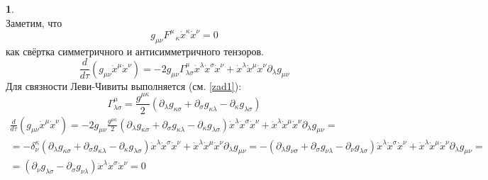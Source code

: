 \documentclass[12pt]{article}
\theoremstyle{definition}
\newtheorem{zad}{}[section]
\begin{document}
\begin{zad}
\begin{equation}
\end{equation}
Заметим, что
\begin{equation}
    g_{\mu\nu}F^\mu_{\;\;\;\kappa}\dot{x}^\kappa\dot{x}^\nu = 0
\end{equation}
как свёртка симметричного и антисимметричного тензоров.
\begin{equation}
    \frac{d}{d\tau}(g_{\mu\nu}\dot{x}^\mu\dot{x}^\nu)=-2g_{\mu\nu}\Gamma^\mu_{\lambda\sigma}\dot{x}^\lambda\dot{x}^\sigma\dot{x}^\nu+\dot{x}^\lambda\dot{x}^\mu\dot{x}^\nu\partial_\lambda g_{\mu\nu}
\end{equation}
Для связности Леви-Чивиты выполняется (см. \ref{zad1}):
\begin{equation}
    \Gamma^\mu_{\lambda\sigma}=\frac{g^{\mu\kappa}}{2}(\partial_\lambda g_{\kappa\sigma}+\partial_\sigma g_{\kappa\lambda}-\partial_\kappa g_{\lambda\sigma})
\end{equation}
\begin{multline}
    \frac{d}{d\tau}(g_{\mu\nu}\dot{x}^\mu\dot{x}^\nu)=-2g_{\mu\nu}\frac{g^{\mu\kappa}}{2}(\partial_\lambda g_{\kappa\sigma}+\partial_\sigma g_{\kappa\lambda}-\partial_\kappa g_{\lambda\sigma})\dot{x}^\lambda\dot{x}^\sigma\dot{x}^\nu+\dot{x}^\lambda\dot{x}^\mu\dot{x}^\nu\partial_\lambda g_{\mu\nu}=\\=-\delta^\kappa_\nu(\partial_\lambda g_{\kappa\sigma}+\partial_\sigma g_{\kappa\lambda}-\partial_\kappa g_{\lambda\sigma})\dot{x}^\lambda\dot{x}^\sigma\dot{x}^\nu+\dot{x}^\lambda\dot{x}^\mu\dot{x}^\nu\partial_\lambda g_{\mu\nu}=-(\partial_\lambda g_{\nu\sigma}+\partial_\sigma g_{\nu\lambda}-\partial_\nu g_{\lambda\sigma})\dot{x}^\lambda\dot{x}^\sigma\dot{x}^\nu+\dot{x}^\lambda\dot{x}^\mu\dot{x}^\nu\partial_\lambda g_{\mu\nu}=\\=(\partial_\nu g_{\lambda\sigma}-\partial_\sigma g_{\nu\lambda})\dot{x}^\lambda\dot{x}^\sigma\dot{x}^\nu=0
\end{multline}
\end{zad}
\end{document}
